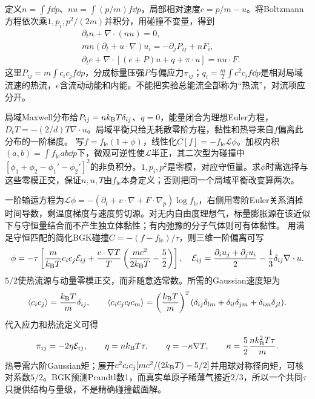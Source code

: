 \label{ch:hydro}
定义$n=\int f\dd p$、$nu=\int(p/m)f\dd p$，局部相对速度$c=p/m-u$。将Boltzmann方程依次乘$1,p_i,p^2/(2m)$并积分，用碰撞不变量，得到
\begin{align}
&\partial_tn+\nabla\cdot(nu)=0,\\
&mn(\partial_t+u\cdot\nabla)u_i=-\partial_jP_{ij}+nF_i,\\
&\partial_te+\nabla\cdot[(e+P)u+q+\pi\cdot u]=nu\cdot F.
\end{align}
这里$P_{ij}=m\int c_ic_jf\dd p$，分成标量压强$P$与偏应力$\pi_{ij}$；$q_i=\frac m2\int c^2c_if\dd p$是相对局域流速的热流，$e$含流动动能和内能。不能把实验总能流全部称为“热流”，对流项应分开。

局域Maxwell分布给$P_{ij}=nk_{\mathrm B} T\delta_{ij}$、$q=0$，能量闭合为理想Euler方程，$D_tT=-(2/d)T\nabla\cdot u$。局域平衡只给无耗散零阶方程，黏性和热导来自$f$偏离此分布的一阶梯度。
写$f=f_{\mathrm{le}}(1+\phi)$，线性化$C[f]=-f_{\mathrm{le}}\mathcal L\phi$。加权内积$(a,b)=\int f_{\mathrm{le}}ab\dd p$下，微观可逆性使$\mathcal L$半正，其二次型为碰撞中$[\phi_1+\phi_2-\phi_1'-\phi_2']^2$的非负积分。$1,p_i,p^2$是零模，对应守恒量。求$\phi$时需选择与这些零模正交，保证$n,u,T$由$f_{\mathrm{le}}$本身定义；否则把同一个局域平衡改变算两次。

一阶输运方程为$\mathcal L\phi=-(\partial_t+v\cdot\nabla+F\cdot\nabla_p)\log f_{\mathrm{le}}$，右侧用零阶Euler关系消掉时间导数，剩温度梯度与速度剪切源。对无内自由度理想气，标量膨胀源在该近似下与守恒量结合而不产生独立体黏性；有内弛豫的分子气体则可有体黏性。
用满足守恒匹配的简化BGK碰撞$C=-(f-f_{\mathrm{le}})/\tau$，则三维一阶偏离可写
\begin{equation}
\phi=-\tau\left[\frac{m}{k_{\mathrm B} T}c_ic_j\mathcal E_{ij}+\frac{c\cdot\nabla T}{T}\left(\frac{mc^2}{2k_{\mathrm B} T}-\frac52\right)\right],\quad\mathcal E_{ij}=\frac{\partial_iu_j+\partial_ju_i}2-\frac13\delta_{ij}\nabla\cdot u.
\end{equation}
$5/2$使热流源与动量零模正交，而非随意选常数。所需的Gaussian速度矩为
\begin{equation}
\langle c_ic_j\rangle=\frac{k_{\mathrm B} T}{m}\delta_{ij},\qquad
\langle c_ic_jc_lc_m\rangle=\left(\frac{k_{\mathrm B} T}{m}\right)^2
(\delta_{ij}\delta_{lm}+\delta_{il}\delta_{jm}+\delta_{im}\delta_{jl}).
\end{equation}
代入应力和热流定义可得
\begin{equation}
\pi_{ij}=-2\eta\mathcal E_{ij},\qquad\eta=nk_{\mathrm B} T\tau,\qquad q=-\kappa\nabla T,\qquad\kappa=\frac52\frac{nk_{\mathrm B}^2T\tau}{m}.
\end{equation}
热导需六阶Gaussian矩；展开$c^2c_ic_j[mc^2/(2k_{\mathrm B} T)-5/2]$并用球对称径向矩，可核对系数$5/2$。BGK预测Prandtl数1，而真实单原子稀薄气接近$2/3$，所以一个共同$\tau$只提供结构与量级，不是精确碰撞截面解。

